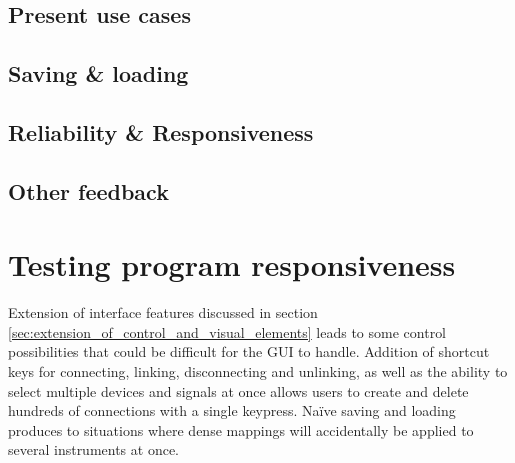 	\subsection{Present use cases} %
	\label{sub:present_use_cases}



	\subsection{Saving \& loading} %
	\label{sub:saving_and_loading}
	

	\subsection{Reliability \& Responsiveness} %
	\label{sub:reliability_and_responsiveness}
	

	\subsection{Other feedback} %
	\label{sub:other_feedback}
	
	

\section{Testing program responsiveness} %
\label{sec:testing_program_responsiveness}

Extension of interface features discussed in section \ref{sec:extension_of_control_and_visual_elements} leads to some control possibilities that could be difficult for the GUI to handle. Addition of shortcut keys for connecting, linking, disconnecting and unlinking, as well as the ability to select multiple devices and signals at once allows users to create and delete hundreds of connections with a single keypress. Na\"{i}ve saving and loading produces to situations where dense mappings will accidentally be applied to several instruments at once.

